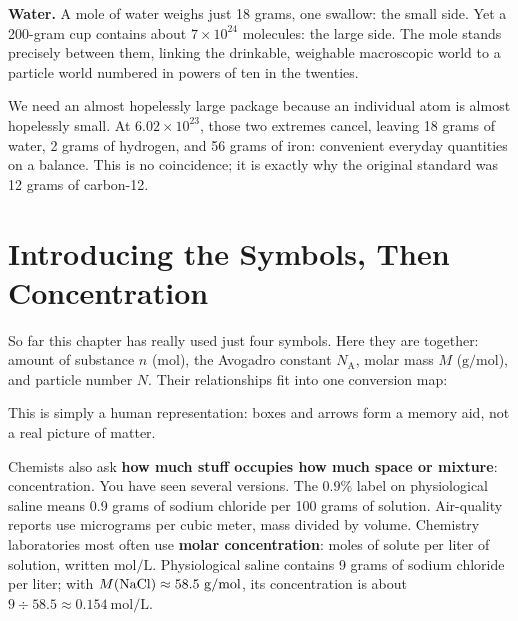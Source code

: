 \textbf{Water.} A mole of water weighs just 18 grams, one swallow: the small side. Yet a 200-gram cup contains about $7\times 10^{24}$ molecules: the large side. The mole stands precisely between them, linking the drinkable, weighable macroscopic world to a particle world numbered in powers of ten in the twenties.

We need an almost hopelessly large package because an individual atom is almost hopelessly small. At $6.02\times 10^{23}$, those two extremes cancel, leaving 18 grams of water, 2 grams of hydrogen, and 56 grams of iron: convenient everyday quantities on a balance. This is no coincidence; it is exactly why the original standard was 12 grams of carbon-12.

\section{Introducing the Symbols, Then Concentration}

So far this chapter has really used just four symbols. Here they are together: amount of substance $n$ (mol), the Avogadro constant $N_{\mathrm{A}}$, molar mass $M$ ($\mathrm{g/mol}$), and particle number $N$. Their relationships fit into one conversion map:

\begin{center}
\end{center}

This is simply a human representation: boxes and arrows form a memory aid, not a real picture of matter.

Chemists also ask \textbf{how much stuff occupies how much space or mixture}: concentration. You have seen several versions. The $0.9\%$ label on physiological saline means 0.9 grams of sodium chloride per 100 grams of solution. Air-quality reports use micrograms per cubic meter, mass divided by volume. Chemistry laboratories most often use \textbf{molar concentration}: moles of solute per liter of solution, written $\mathrm{mol/L}$. Physiological saline contains 9 grams of sodium chloride per liter; with $M(\chem{NaCl})\approx 58.5\ \mathrm{g/mol}$, its concentration is about $9\div 58.5\approx 0.154\ \mathrm{mol/L}$.

